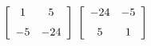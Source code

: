 {$\left[ \begin {array}{cc} 1&5\\\noalign{\medskip}-5&-24\end {array}
 \right]$ 
 }
{$\left[ \begin {array}{cc} -24&-5\\\noalign{\medskip}5&1\end {array}
 \right]$ }
